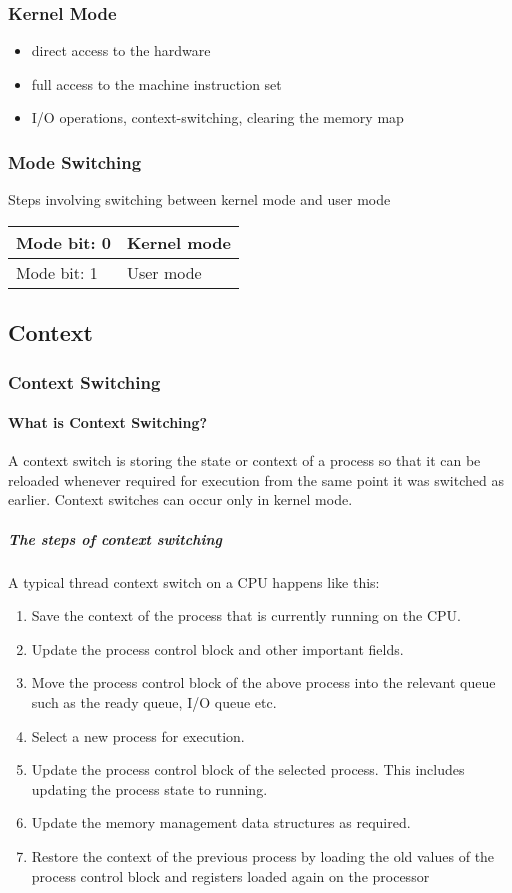 \subsubsection{Kernel Mode}
\begin{itemize}
	\item direct access to the hardware 
	\item full access to the machine instruction set
	\item I/O operations, context-switching, clearing the memory map
\end{itemize}

\subsubsection{Mode Switching} Steps involving switching between kernel mode and user mode\\
\begin{tabular}{|l|l|}
	\hline 
	Mode bit: 0 & Kernel mode \\ 
	\hline 
	Mode bit: 1 & User mode \\ 
	\hline 
\end{tabular} 

\subsection{Context}
\subsubsection{Context Switching}
\paragraph{What is Context Switching?}
A context switch is storing the state or context of a process so that it can be reloaded whenever required for execution from the same point it was switched as earlier. Context switches can occur only in kernel mode.
\subparagraph{The steps of context switching}
A typical thread context switch on a CPU happens like this:
\begin{enumerate}
	\item Save the context of the process that is currently running on the CPU.
	\item Update the process control block and other important fields.
	\item Move the process control block of the above process into the relevant queue such as the ready queue, I/O queue etc.
	\item Select a new process for execution.
	\item Update the process control block of the selected process. This includes updating the process state to running.
	\item Update the memory management data structures as required.
	\item Restore the context of the previous process by loading the old values of the process control block and registers loaded again on the processor
\end{enumerate}

